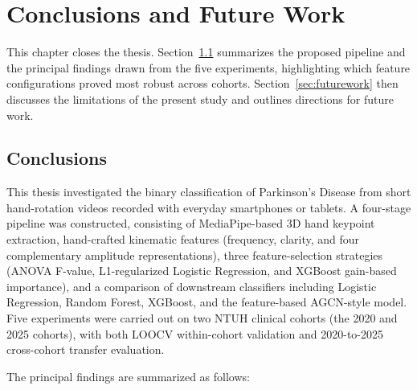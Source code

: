 
\chapter{Conclusions and Future Work}
\label{chap:conclusion}

This chapter closes the thesis. Section~\ref{sec:conclusions} summarizes the proposed pipeline and the principal findings drawn from the five experiments, highlighting which feature configurations proved most robust across cohorts. Section~\ref{sec:futurework} then discusses the limitations of the present study and outlines directions for future work.

\section{Conclusions}
\label{sec:conclusions}

This thesis investigated the binary classification of Parkinson's Disease from short hand-rotation videos recorded with everyday smartphones or tablets. A four-stage pipeline was constructed, consisting of MediaPipe-based 3D hand keypoint extraction, hand-crafted kinematic features (frequency, clarity, and four complementary amplitude representations), three feature-selection strategies (ANOVA F-value, L1-regularized Logistic Regression, and XGBoost gain-based importance), and a comparison of downstream classifiers including Logistic Regression, Random Forest, XGBoost, and the feature-based AGCN-style model. Five experiments were carried out on two NTUH clinical cohorts (the 2020 and 2025 cohorts), with both LOOCV within-cohort validation and 2020-to-2025 cross-cohort transfer evaluation.

The principal findings are summarized as follows:

